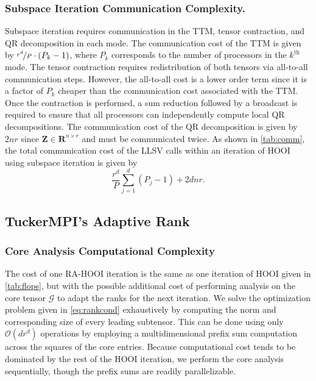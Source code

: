     \subsubsection{Subspace Iteration Communication Complexity.}
        Subspace iteration requires communication in the TTM, tensor contraction, and QR
        decomposition in each mode. The communication cost of the TTM is given by
        $\nicefrac{r^d}{P}\cdot (P_k - 1)$, where $P_k$ corresponds to the number of
        processors in the $k^\text{th}$ mode. The tensor contraction requires redistribution of
        both tensors via all-to-all communication steps. However, the all-to-all cost is
        a lower order term since it is a factor of $P_k$ cheaper than the communication
        cost associated with the TTM. Once the contraction is performed, a sum reduction
        followed by a broadcast is required to ensure that all processors can
        independently compute local QR decompositions. The communication cost of the QR
        decomposition is given by $2nr$ since $\mathbf{Z} \in \mathbf{R}^{n\times r}$ and must be
        communicated twice. As shown in \cref{tab:comm}, the total communication cost of
        the LLSV calls within an iteration of HOOI using subspace iteration is given by
        \begin{equation*}
            \frac{r^d}{P}\sum_{j=1}^{d}\left(P_j - 1\right) + 2dnr.
        \end{equation*}







\subsection{TuckerMPI's Adaptive Rank} \label{TuckerMPI's Adaptive Rank}
    \subsubsection{Core Analysis Computational Complexity} \label{sec:Core Analysis Computational Complexity}

        The cost of one RA-HOOI iteration is the same as one iteration of HOOI given in
        \cref{tab:flops}, but with the possible additional cost of performing analysis
        on the core tensor $\mathcal{G}$ to adapt the ranks for the next iteration. We solve
        the optimization problem given in \cref{eq:rankcond} exhaustively by computing
        the norm and corresponding size of every leading subtensor. This can be done
        using only $\mathcal O(dr^d)$ operations by employing a multidimensional prefix
        sum computation across the squares of the core entries. Because computational
        cost tends to be dominated by the rest of the HOOI iteration, we perform the
        core analysis sequentially, though the prefix sums are readily parallelizable.

